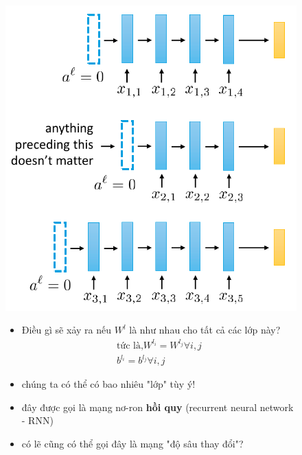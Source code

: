 \documentclass{book}
\begin{document}
\begin{figure}[H]
    \centering
    \begin{minipage}[c]{0.35\textwidth}
        \centering
        \includegraphics[width=\textwidth]{images/variable_layer_count.png}
    \end{minipage}
    \begin{minipage}[c]{0.35\textwidth}
        \begin{itemize}
            \item[] Điều gì sẽ xảy ra nếu $W^l$ là như nhau cho tất cả các lớp này? \begin{equation*}
                \begin{aligned}
                    \text{tức là,} W^{l_i}=W^{l_j} \forall i, j \\ b^{l_i}=b^{l_j} \forall i, j 
                \end{aligned}
            \end{equation*}
            \item[] chúng ta có thể có bao nhiêu "lớp" tùy ý!
            \item[] đây được gọi là mạng nơ-ron \textbf{hồi quy} (recurrent neural network - RNN)
            \item[] có lẽ cũng có thể gọi đây là mạng "độ sâu thay đổi"?

\end{itemize}
\end{minipage}
\end{figure}
\end{document}
